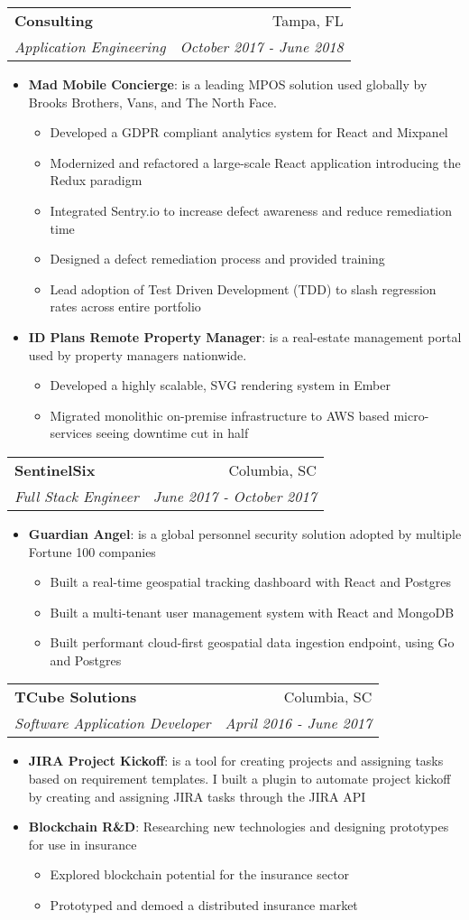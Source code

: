 \documentclass[a4paper]{article}
\makeatletter
\newcommand{\resumeItem}[2]{
  \item\small{
    \textbf{#1}{: #2 \vspace{-2pt}}
  }
}
\newcommand{\resumeSubheading}[4]{
  \vspace{-1pt}\item
    \begin{tabular*}{0.97\textwidth}[t]{l@{\extracolsep{\fill}}r}
      \textbf{#1} & #2 \\
      \textit{\small#3} & \textit{\small #4} \\
    \end{tabular*}\vspace{-5pt}
}
\newcommand{\resumeItemListStart}{\begin{itemize}}
\newcommand{\resumeItemListEnd}{\end{itemize}\vspace{-5pt}}
\makeatother
\begin{document}
	\resumeSubheading
		{Consulting}{Tampa, FL}
		{Application Engineering}{October 2017 - June 2018}
		\resumeItemListStart
			\resumeItem{Mad Mobile Concierge}
				{is a leading MPOS solution used globally by Brooks Brothers, Vans, and The North Face.}
				\begin{itemize}
					\item Developed a GDPR compliant analytics system for React and Mixpanel
					\item Modernized and refactored a large-scale React application introducing the Redux paradigm
					\item Integrated Sentry.io to increase defect awareness and reduce remediation time
					\item Designed a defect remediation process and provided training
					\item Lead adoption of Test Driven Development (TDD) to slash regression rates across entire portfolio
				\end{itemize}
			\resumeItem{ID Plans Remote Property Manager}{is a real-estate management portal used by property managers nationwide.}
				\begin{itemize}
					\item Developed a highly scalable, SVG rendering system in Ember
					\item Migrated monolithic on-premise infrastructure to AWS based micro-services seeing downtime cut in half
				\end{itemize}
		\resumeItemListEnd

	\resumeSubheading
		{SentinelSix}{Columbia, SC}
		{Full Stack Engineer}{June 2017 - October 2017}
		\resumeItemListStart
			\resumeItem{Guardian Angel}{is a global personnel security solution adopted by multiple Fortune 100 companies}
			\begin{itemize}
             \item Built a real-time geospatial tracking dashboard with React and Postgres
             \item Built a multi-tenant user management system with React and MongoDB
             \item Built performant cloud-first geospatial data ingestion endpoint, using Go and Postgres
            \end{itemize}
		\resumeItemListEnd

    \resumeSubheading
		{TCube Solutions}{Columbia, SC}
		{Software Application Developer}{April 2016 - June 2017}
		\resumeItemListStart
			\resumeItem{JIRA Project Kickoff}{is a tool for creating projects and assigning tasks based on requirement templates. I built a plugin to automate project kickoff by creating and assigning JIRA tasks through the JIRA API}
    		\resumeItem{Blockchain R\&D}{Researching new technologies and designing prototypes for use in insurance}
				\begin{itemize}
                	\item Explored blockchain potential for the insurance sector
                	\item Prototyped and demoed a distributed insurance market
            	\end{itemize}
		\resumeItemListEnd
\end{document}
